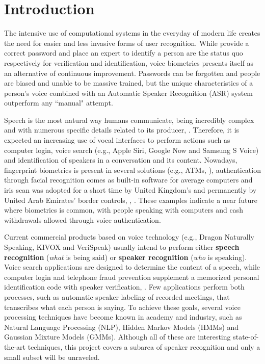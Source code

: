 \chapter{Introduction}
\label{ch:intro}

The intensive use of computational systems in the everyday of modern life creates the need for easier and less invasive forms of user recognition. While provide a correct password and place an expert to identify a person are the status quo respectively for verification and identification, voice biometrics presents itself as an alternative of continuous improvement. Passwords can be forgotten and people are biased and unable to be massive trained, but the unique characteristics of a person's voice combined with an Automatic Speaker Recognition (ASR) system outperform any ``manual" attempt.

Speech is the most natural way humans communicate, being incredibly complex and with numerous specific details related to its producer, . Therefore, it is expected an increasing use of vocal interfaces to perform actions such as computer login, voice search (e.g., Apple Siri, Google Now and Samsung S Voice) and identification of speakers in a conversation and its content. Nowadays, fingerprint biometrics is present in several solutions (e.g., ATMs, ), authentication through facial recognition comes as built-in software for average computers and iris scan was adopted for a short time by United Kingdom's and permanently by United Arab Emirates' border controls, , . These examples indicate a near future where biometrics is common, with people speaking with computers and cash withdrawals allowed through voice authentication.

Current commercial products based on voice technology (e.g., Dragon Naturally Speaking, KIVOX and VeriSpeak) usually intend to perform either \textbf{speech recognition} (\emph{what} is being said) or \textbf{speaker recognition} (\emph{who} is speaking). Voice search applications are designed to determine the content of a speech, while computer login and telephone fraud prevention supplement a memorized personal identification code with speaker verification, . Few applications perform both processes, such as automatic speaker labeling of recorded meetings, that transcribes what each person is saying. To achieve these goals, several voice processing techniques have become known in academy and industry, such as Natural Language Processing (NLP), Hidden Markov Models (HMMs) and Gaussian Mixture Models (GMMs). Although all of these are interesting state-of-the-art techniques, this project covers a subarea of speaker recognition and only a small subset will be unraveled.

